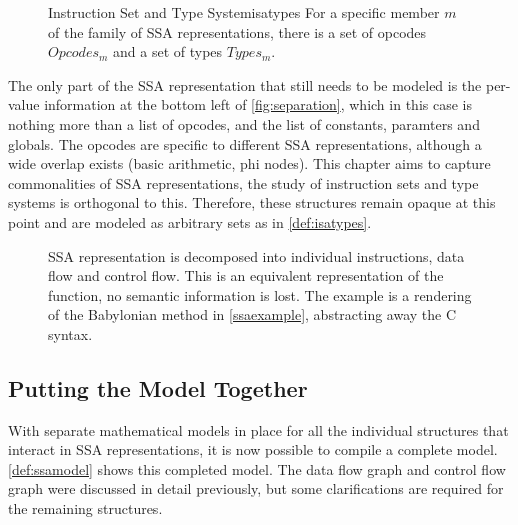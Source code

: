 \begin{figure}[b]
\begin{definition}{Instruction Set and Type System}{isatypes}
    For a specific member $m$ of the family of SSA representations, there is
    a set of opcodes $Opcodes_m$ and a set of types $Types_m$.
\end{definition}
\end{figure}

    The only part of the SSA representation that still needs to be modeled is
    the per-value information at the bottom left of \autoref{fig:separation},
    which in this case is nothing more than a list of opcodes, and the list of
    constants, paramters and globals.
    The opcodes are specific to different SSA representations, although a wide
    overlap exists (basic arithmetic, phi nodes).
    This chapter aims to capture commonalities of SSA representations, the study
    of instruction sets and type systems is orthogonal to this.
    Therefore, these structures remain opaque at this point and are modeled as
    arbitrary sets as in \autoref{def:isatypes}.

\begin{figure}[p]

\caption{SSA representation is decomposed into individual instructions, data
         flow and control flow.
         This is an equivalent representation of the function, no semantic
         information is lost.
         The example is a rendering of the Babylonian method in
         \autoref{ssaexample}, abstracting away the C syntax.}
\label{fig:separation}
\end{figure}

\subsection{Putting the Model Together}

\begin{figure}[p]
    
\end{figure}

    With separate mathematical models in place for all the individual structures
    that interact in SSA representations, it is now possible to compile a
    complete model.
    \autoref{def:ssamodel} shows this completed model.
    The data flow graph and control flow graph were discussed in detail
    previously, but some clarifications are required for the remaining
    structures.

